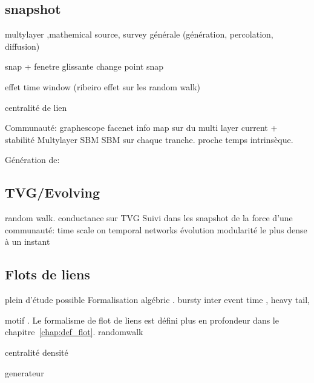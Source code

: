 \subsection{snapshot}
multylayer \cite{Mucha2010,Kivela2014,Peixoto2015c},mathemical source\cite{DeDomenico2013}, survey générale (génération, percolation, diffusion) \cite{Boccaletti2014}

snap\cite{Asur2009,Bassett2013,Bazzi2014} + fenetre glissante
\cite{de2016detection,Rosvall2010} change point snap

effet time window \cite{Krings2012,Ribeiro2013} (ribeiro effet sur les random walk)

centralité de lien \cite{Takaguchi2012}

Communauté:
\cite{Sun2007} graphescope
\cite{Lin2008} facenet
\cite{DeDomenico2014} info map sur du multi layer
\cite{Chakrabarti2006,Chen2013} current + stabilité
Multylayer SBM\cite{Stanley2015} \cite{Corneli2016} SBM sur chaque tranche. proche\cite{Matias2015}
\cite{Gauvin2014}
\cite{Guo2014}
\cite{Hopcroft2004}
\cite{Kalavathi2015}
temps intrinsèque.
\cite{Albano2014}

Génération de: \cite{Granell2015, Karsai2014,Perra2012}

\subsection{TVG/Evolving}
\cite{Casteigts2011,Wehmuth2014}
\cite{Figueiredo2012} random walk.
\cite{Cazabet2010} conductance sur TVG
Suivi dans les snapshot de la force d'une communauté: \cite{Du2015}
\cite{Caceres2013} time scale on temporal networks 
\cite{Cordeiro2016} évolution modularité
\cite{Epasto2015} le plus dense à un instant
\cite{Sun2014}

\subsection{Flots de liens}
\cite{Holme2013a,Holme2015b,Holme2015} plein d'étude possible
Formalisation algébric \cite{Batagelj2015}.
bursty \cite{Karsai2012a,Karsai2011,Moinet2015,Stehle2010} inter event time \cite{Kivela2014a}, \cite{Malmgren2008,Malmgren2009} heavy tail, \cite{Rocha2013}

motif \cite{Kovanen2011a,Kovanen2013}.
Le formalisme de flot de liens est défini plus en profondeur dans le chapitre~\ref{chap:def_flot}.
randomwalk\cite{Starnini2012b}

\cite{Gaumont2016}
centralité \cite{Costa2015,Kim2012, Pfitzner2013a, Praprotnik2015,Scholtes2015,Takaguchi2016}
densité \cite{Viard2014a}

generateur \cite{Starnini2013,Vestergaard2014}